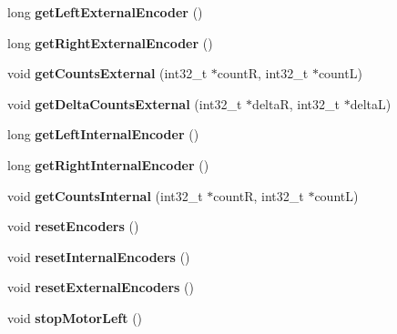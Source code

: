 \begin{DoxyCompactItemize}
long {\bfseries get\+Left\+External\+Encoder} ()
\item 
\mbox{\label{classAsservDriver_afda042c513d96188f8572899679cc616}} 
long {\bfseries get\+Right\+External\+Encoder} ()
\item 
\mbox{\label{classAsservDriver_a40d638a52c2ef3c2e98fe4ffa9a7bfe9}} 
void {\bfseries get\+Counts\+External} (int32\+\_\+t $\ast$countR, int32\+\_\+t $\ast$countL)
\item 
\mbox{\label{classAsservDriver_a588e61ea789b256d73fd04b1f7a840b5}} 
void {\bfseries get\+Delta\+Counts\+External} (int32\+\_\+t $\ast$deltaR, int32\+\_\+t $\ast$deltaL)
\item 
\mbox{\label{classAsservDriver_a01959c5fd48ed61fedfb22a6c3605ea2}} 
long {\bfseries get\+Left\+Internal\+Encoder} ()
\item 
\mbox{\label{classAsservDriver_a00e162296e20e589d7117b2427908aa6}} 
long {\bfseries get\+Right\+Internal\+Encoder} ()
\item 
\mbox{\label{classAsservDriver_a643c154d40a2842293fcbf433dc73ee1}} 
void {\bfseries get\+Counts\+Internal} (int32\+\_\+t $\ast$countR, int32\+\_\+t $\ast$countL)
\item 
\mbox{\label{classAsservDriver_a1d4095fd5abc9597f5aa35fc4d02f3fa}} 
void {\bfseries reset\+Encoders} ()
\item 
\mbox{\label{classAsservDriver_a9375c998721a68c0fcdd1c538642fdc6}} 
void {\bfseries reset\+Internal\+Encoders} ()
\item 
\mbox{\label{classAsservDriver_a62108360983265520b0401a71f810f6a}} 
void {\bfseries reset\+External\+Encoders} ()
\item 
\mbox{\label{classAsservDriver_a69fb8c78d0ced7bd7f330c18952c84f4}} 
void {\bfseries stop\+Motor\+Left} ()
\item 
\mbox{\label{classAsservDriver_ab24bc1636143db604ecbad3b18a17c8c}} 

\end{DoxyCompactItemize}

